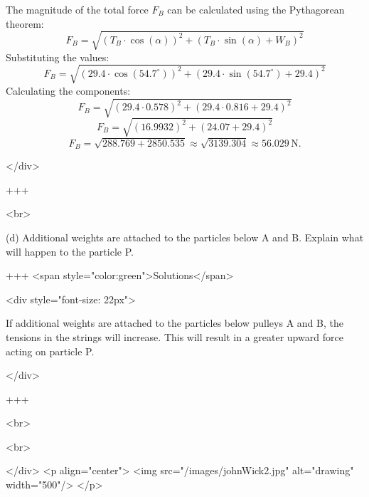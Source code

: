 The magnitude of the total force \(F_B\) can be calculated using the Pythagorean theorem:
\[F_B = \sqrt{(T_B \cdot \cos(\alpha))^2 + (T_B \cdot \sin (\alpha) + W_B)^2}\]
Substituting the values:
\[F_B = \sqrt{(29.4 \cdot \cos(54.7^\circ))^2 + (29.4 \cdot \sin (54.7^\circ) + 29.4)^2}\]
Calculating the components:
\[F_B = \sqrt{(29.4 \cdot 0.578)^2 + (29.4 \cdot 0.816 + 29.4)^2}\]
\[F_B = \sqrt{(16.9932)^2 + (24.07 + 29.4)^2}\]
\[F_B = \sqrt{288.769 + 2850.535} \approx \sqrt{3139.304} \approx 56.029 \, \text{N}.\]

</div>

+++

<br>


(d) Additional weights are attached to the particles below A and B. Explain what will happen to the particle P.


+++ <span style="color:green">Solutions</span>

<div style="font-size: 22px">

If additional weights are attached to the particles below pulleys A and B, the tensions in the strings will increase. This will result in a greater upward force acting on particle P.

</div>

+++

<br>


<br>

</div>
<p align="center">
<img src="/images/johnWick2.jpg" alt="drawing" width="500"/>
</p>

